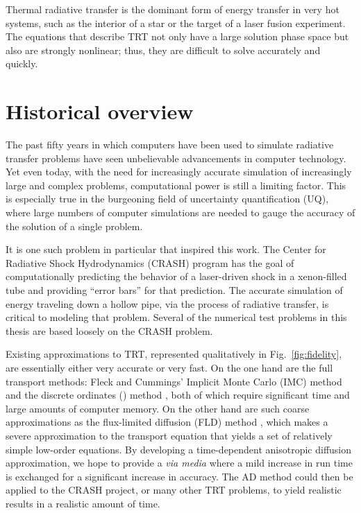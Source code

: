Thermal radiative transfer is the dominant form of energy transfer in very
hot systems, such as the interior of a star or the target of a laser fusion
experiment. The equations that describe TRT not only have a large solution
phase space but also are strongly nonlinear; thus, they are difficult to solve
accurately and quickly.

\section{Historical overview}

The past fifty years in which computers have been used to simulate radiative
transfer problems \cite{Cam1964,Cam1969} have seen unbelievable
advancements in computer technology.
Yet even today, with the need for increasingly accurate simulation of
increasingly
large and complex problems, computational power is still a limiting factor.
This is especially true in the burgeoning field of uncertainty quantification
(UQ), where large numbers of computer simulations are needed to gauge the
accuracy of the solution of a single problem.

It is one such problem in particular that inspired this work. The Center for
Radiative Shock Hydrodynamics (CRASH) program \cite{Crash2010} has the goal of
computationally predicting the behavior of a laser-driven shock in a
xenon-filled tube and providing ``error bars'' for that prediction. The accurate
simulation of energy traveling down a hollow pipe, via the process of
radiative transfer, is critical to modeling that problem. Several of the
numerical test problems in this thesis are based loosely on the CRASH problem.

Existing approximations to TRT, represented qualitatively in
Fig.~\ref{fig:fidelity}, are essentially either very accurate or very fast. On
the one hand are the full transport methods: Fleck and Cummings' Implicit Monte
Carlo (IMC) method \cite{Fle1971} and the discrete ordinates (\SN) method
\cite{Ada1998a}, both of which require significant time and large amounts of
computer memory. On the other hand are such coarse approximations as the
flux-limited diffusion (FLD) method \cite{Ols2000}, which makes a severe
approximation to the transport equation that yields a set of relatively simple
low-order equations. By developing a
time-dependent anisotropic diffusion approximation, we hope to provide a
\emph{via media} where a mild increase in run time is exchanged for a
significant increase in
accuracy. The AD method could then be applied to the CRASH project, or many
other TRT problems, to yield
realistic results in a realistic amount of time.

